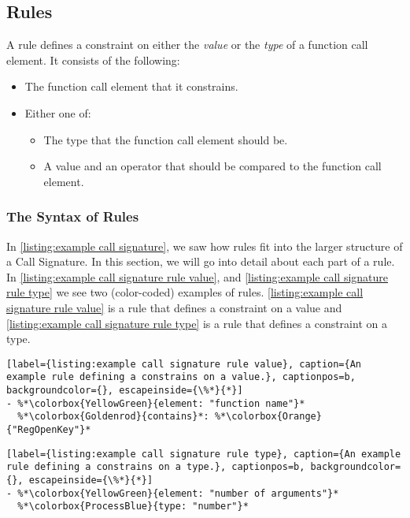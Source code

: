 \subsection{Rules}\label{section:call signature rules}
A rule defines a constraint on either the \emph{value} or the \emph{type} of a function call element. It consists of the following:
\begin{itemize}
  \item The function call element that it constrains.
  \item Either one of:
    \begin{itemize}
      \item The type that the function call element should be.

      \item A value and an operator that should be compared to the function call element.
    \end{itemize}
\end{itemize}

\subsubsection{The Syntax of Rules}\label{section:call signature rule structure}
In \autoref{listing:example call signature}, we saw how rules fit into the larger structure of a Call Signature. In this section, we will go into detail about each part of a rule. In \autoref{listing:example call signature rule value}, and \autoref{listing:example call signature rule type} we see two (color-coded) examples of rules. \autoref{listing:example call signature rule value} is a rule that defines a constraint on a value and \autoref{listing:example call signature rule type} is a rule that defines a constraint on a type.

\begin{minipage}[t]{0.40\textwidth}
\begin{lstlisting}[label={listing:example call signature rule value}, caption={An example rule defining a constrains on a value.}, captionpos=b, backgroundcolor={}, escapeinside={\%*}{*}]
- %*\colorbox{YellowGreen}{element: "function name"}*
  %*\colorbox{Goldenrod}{contains}*: %*\colorbox{Orange}{"RegOpenKey"}*
\end{lstlisting}
\end{minipage}\hfill
\begin{minipage}[t]{0.50\textwidth}
\begin{lstlisting}[label={listing:example call signature rule type}, caption={An example rule defining a constrains on a type.}, captionpos=b, backgroundcolor={}, escapeinside={\%*}{*}]
- %*\colorbox{YellowGreen}{element: "number of arguments"}*
  %*\colorbox{ProcessBlue}{type: "number"}*
\end{lstlisting}
\end{minipage}

